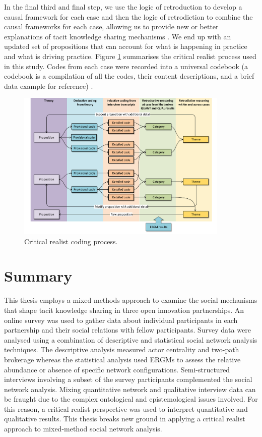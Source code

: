 In the final third and final step, we use the logic of retroduction to develop a causal framework for each case and then the logic of retrodiction to combine the causal frameworks for each case, allowing us to provide new or better explanations of tacit knowledge sharing mechanisms \citep{mcavoy2018critical}. We end up with an updated set of propositions that can account for what is happening in practice and what is driving practice. Figure \ref{fig:coding_process} summarises the critical realist process used in this study. Codes from each case were recorded into a universal codebook (a codebook is a compilation of all the codes, their content descriptions, and a brief data example for reference) \citep{guest2011applied}. 

\begin{figure}
\centering
\includegraphics[width = 0.9\textwidth,
height = 0.7\textheight, keepaspectratio]{Images/CR.pdf}
\caption[Critical realist coding process]{Critical realist coding process.}
\label{fig:coding_process}
\end{figure}

\section{Summary}

This thesis employs a mixed-methods approach to examine the social mechanisms that shape tacit knowledge sharing in three open innovation partnerships. An online survey was used to gather data about individual participants in each partnership and their social relations with fellow participants. Survey data were analysed using a combination of descriptive and statistical social network analysis techniques. The descriptive analysis measured actor centrality and two-path brokerage whereas the statistical analysis used ERGMs to assess the relative abundance or absence of specific network configurations. Semi-structured interviews involving a subset of the survey participants complemented the social network analysis. Mixing quantitative network and qualitative interview data can be fraught due to the complex ontological and epistemological issues involved. For this reason, a critical realist perspective was used to interpret quantitative and qualitative results. This thesis breaks new ground in applying a critical realist approach to mixed-method social network analysis. \medskip

